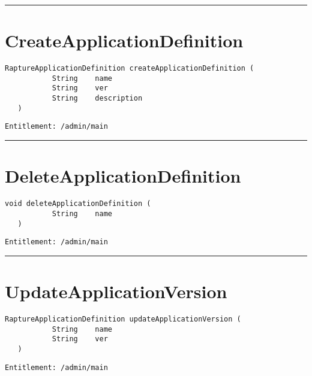 \rule{12cm}{2pt}
\section{CreateApplicationDefinition}
\label{Api:CreateApplicationDefinition}
\begin{lstlisting}[style=nonumbers]
   RaptureApplicationDefinition createApplicationDefinition (
           String    name
           String    ver
           String    description
   )
\end{lstlisting}
\begin{Verbatim}[formatcom=\color{Maroon}]
  Entitlement: /admin/main
\end{Verbatim}



\rule{12cm}{2pt}
\section{DeleteApplicationDefinition}
\label{Api:DeleteApplicationDefinition}
\begin{lstlisting}[style=nonumbers]
   void deleteApplicationDefinition (
           String    name
   )
\end{lstlisting}
\begin{Verbatim}[formatcom=\color{Maroon}]
  Entitlement: /admin/main
\end{Verbatim}



\rule{12cm}{2pt}
\section{UpdateApplicationVersion}
\label{Api:UpdateApplicationVersion}
\begin{lstlisting}[style=nonumbers]
   RaptureApplicationDefinition updateApplicationVersion (
           String    name
           String    ver
   )
\end{lstlisting}
\begin{Verbatim}[formatcom=\color{Maroon}]
  Entitlement: /admin/main
\end{Verbatim}



